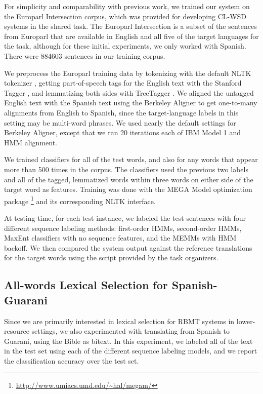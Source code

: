 \documentclass[11pt]{article}
\begin{document}
For simplicity and comparability with previous work, we trained our system on
the Europarl Intersection corpus, which was provided for developing CL-WSD
systems in the shared task.  The Europarl Intersection is a subset of the
sentences from Europarl \cite{europarl} that are available in English and all
five of the target languages for the task, although for these initial
experiments, we only worked with Spanish. There were 884603 sentences in our
training corpus.

We preprocess the Europarl training data by tokenizing with the default NLTK
tokenizer \cite{nltkbook}, getting part-of-speech tags for the English text
with the Stanford Tagger \cite{Toutanova03feature-richpart-of-speech}, and
lemmatizing both sides with TreeTagger \cite{Schmid95improvementsin}.  We
aligned the untagged English text with the Spanish text using the Berkeley
Aligner \cite{denero-klein:2007:ACLMain} to get one-to-many alignments from
English to Spanish, since the target-language labels in this setting may be
multi-word phrases. We used nearly the default settings for Berkeley Aligner,
except that we ran 20 iterations each of IBM Model 1 and HMM alignment.

We trained classifiers for all of the test words, and also for any words that
appear more than 500 times in the corpus. The classifiers used the previous two
labels and all of the tagged, lemmatized words within three words on either
side of the target word as features. Training was done with the MEGA Model
optimization package \footnote{\url{http://www.umiacs.umd.edu/~hal/megam/}} and
its corresponding NLTK interface.

At testing time, for each test instance, we labeled the test sentences with
four different sequence labeling methods: first-order HMMs, second-order HMMs,
MaxEnt classifiers with no sequence features, and the MEMMs with HMM backoff.
We then compared the system output against the reference translations for the
target words using the script provided by the task organizers.

\subsection{All-words Lexical Selection for Spanish-Guarani}
Since we are primarily interested in lexical selection for RBMT systems in
lower-resource settings, we also experimented with translating from Spanish to
Guarani, using the Bible as bitext. In this experiment, we labeled all of the
text in the test set using each of the different sequence labeling models, and
we report the classification accuracy over the test set.
\end{document}
